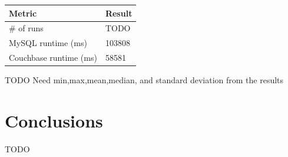 \documentclass[]{IEEEtran}
\begin{document}
\begin{center}
\begin{tabular}{|l|l|}
	\hline
	{\bf Metric} & {\bf Result} \\
	\hline
        \# of runs & TODO \\
        \hline
        MySQL runtime (ms) & 103808 \\
	\hline
        Couchbase runtime (ms) & 58581 \\
        \hline
\end{tabular}
\end{center}

TODO Need min,max,mean,median, and standard deviation from the results

\section{Conclusions}\label{sec:conclusions}
TODO

% 
% 
\end{document}
